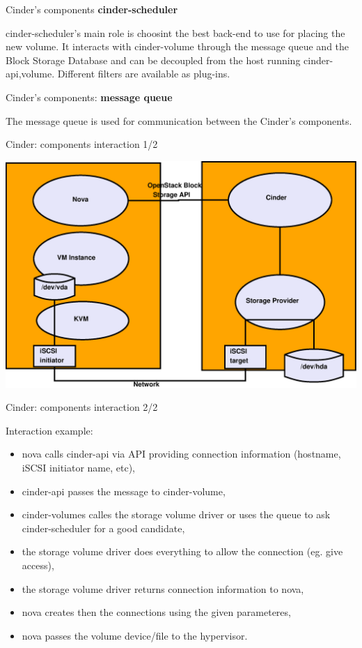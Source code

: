 \documentclass[english,serif,mathserif]{beamer}
\begin{document}
\begin{frame}{Cinder's components \textbf{cinder-scheduler}}

cinder-scheduler's main role is choosint the best back-end to use for placing the new volume. 
It interacts with cinder-volume through the message queue and the Block Storage Database 
and can be decoupled from the host running cinder-{api,volume}. Different filters are available 
as plug-ins.

\end{frame}

\begin{frame}{Cinder's components: \textbf{message queue}}

The message queue is used for communication between the Cinder's components.  

\end{frame}

\begin{frame}{Cinder: components interaction 1/2}

\centerline{\includegraphics[scale=0.30]{cinder.eps}}

\end{frame}

\begin{frame}{Cinder: components interaction 2/2}

Interaction example:

\begin{itemize}
\item nova calls cinder-api via API providing connection information (hostname, iSCSI initiator name, etc),
\item cinder-api passes the message to cinder-volume,
\item cinder-volumes calles the storage volume driver or uses the queue to ask cinder-scheduler for a good candidate,
\item the storage volume driver does everything to allow the connection (eg. give access),
\item the storage volume driver returns connection information to nova,
\item nova creates then the connections using the given parameteres,
\item nova passes the volume device/file to the hypervisor.  
\end{itemize}

\end{frame}
\end{document}
